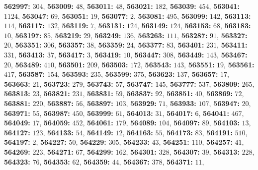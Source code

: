 \textsf{\bfseries 562997:} $304$, \textsf{\bfseries 563009:} $48$, \textsf{\bfseries 563011:} $48$, \textsf{\bfseries 563021:} $182$, \textsf{\bfseries 563039:} $454$, \textsf{\bfseries 563041:} $1124$, \textsf{\bfseries 563047:} $69$, \textsf{\bfseries 563051:} $19$, \textsf{\bfseries 563077:} $2$, \textsf{\bfseries 563081:} $495$, \textsf{\bfseries 563099:} $142$, \textsf{\bfseries 563113:} $114$, \textsf{\bfseries 563117:} $132$, \textsf{\bfseries 563119:} $7$, \textsf{\bfseries 563131:} $124$, \textsf{\bfseries 563149:} $124$, \textsf{\bfseries 563153:} $68$, \textsf{\bfseries 563183:} $10$, \textsf{\bfseries 563197:} $85$, \textsf{\bfseries 563219:} $29$, \textsf{\bfseries 563249:} $136$, \textsf{\bfseries 563263:} $111$, \textsf{\bfseries 563287:} $91$, \textsf{\bfseries 563327:} $20$, \textsf{\bfseries 563351:} $306$, \textsf{\bfseries 563357:} $38$, \textsf{\bfseries 563359:} $24$, \textsf{\bfseries 563377:} $83$, \textsf{\bfseries 563401:} $231$, \textsf{\bfseries 563411:} $331$, \textsf{\bfseries 563413:} $37$, \textsf{\bfseries 563417:} $3$, \textsf{\bfseries 563419:} $10$, \textsf{\bfseries 563447:} $308$, \textsf{\bfseries 563449:} $143$, \textsf{\bfseries 563467:} $20$, \textsf{\bfseries 563489:} $410$, \textsf{\bfseries 563501:} $209$, \textsf{\bfseries 563503:} $172$, \textsf{\bfseries 563543:} $143$, \textsf{\bfseries 563551:} $19$, \textsf{\bfseries 563561:} $417$, \textsf{\bfseries 563587:} $154$, \textsf{\bfseries 563593:} $235$, \textsf{\bfseries 563599:} $375$, \textsf{\bfseries 563623:} $137$, \textsf{\bfseries 563657:} $17$, \textsf{\bfseries 563663:} $21$, \textsf{\bfseries 563723:} $279$, \textsf{\bfseries 563743:} $57$, \textsf{\bfseries 563747:} $145$, \textsf{\bfseries 563777:} $537$, \textsf{\bfseries 563809:} $265$, \textsf{\bfseries 563813:} $23$, \textsf{\bfseries 563821:} $231$, \textsf{\bfseries 563831:} $59$, \textsf{\bfseries 563837:} $92$, \textsf{\bfseries 563851:} $40$, \textsf{\bfseries 563869:} $72$, \textsf{\bfseries 563881:} $220$, \textsf{\bfseries 563887:} $56$, \textsf{\bfseries 563897:} $103$, \textsf{\bfseries 563929:} $71$, \textsf{\bfseries 563933:} $107$, \textsf{\bfseries 563947:} $20$, \textsf{\bfseries 563971:} $55$, \textsf{\bfseries 563987:} $450$, \textsf{\bfseries 563999:} $61$, \textsf{\bfseries 564013:} $31$, \textsf{\bfseries 564017:} $6$, \textsf{\bfseries 564041:} $467$, \textsf{\bfseries 564049:} $17$, \textsf{\bfseries 564059:} $452$, \textsf{\bfseries 564061:} $179$, \textsf{\bfseries 564089:} $104$, \textsf{\bfseries 564097:} $89$, \textsf{\bfseries 564103:} $13$, \textsf{\bfseries 564127:} $123$, \textsf{\bfseries 564133:} $54$, \textsf{\bfseries 564149:} $12$, \textsf{\bfseries 564163:} $55$, \textsf{\bfseries 564173:} $83$, \textsf{\bfseries 564191:} $510$, \textsf{\bfseries 564197:} $2$, \textsf{\bfseries 564227:} $50$, \textsf{\bfseries 564229:} $305$, \textsf{\bfseries 564233:} $43$, \textsf{\bfseries 564251:} $110$, \textsf{\bfseries 564257:} $41$, \textsf{\bfseries 564269:} $223$, \textsf{\bfseries 564271:} $67$, \textsf{\bfseries 564299:} $162$, \textsf{\bfseries 564301:} $328$, \textsf{\bfseries 564307:} $39$, \textsf{\bfseries 564313:} $228$, \textsf{\bfseries 564323:} $76$, \textsf{\bfseries 564353:} $62$, \textsf{\bfseries 564359:} $44$, \textsf{\bfseries 564367:} $378$, \textsf{\bfseries 564371:} $11$, 
